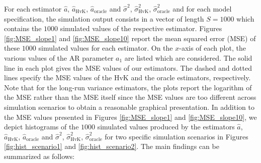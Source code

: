 For each estimator $\widehat{a}$, $\widehat{a}_{\text{HvK}}$, $\widehat{a}_{\text{oracle}}$ and $\widehat{\sigma}^2$, $\widehat{\sigma}^2_{\text{HvK}}$, $\widehat{\sigma}^2_{\text{oracle}}$ and for each model specification, the simulation output consists in a vector of length $S=1000$ which contains the $1000$ simulated values of the respective estimator. Figures \ref{fig:MSE_slope1} and \ref{fig:MSE_slope10} report the mean squared error (MSE) of these $1000$ simulated values for each estimator. On the $x$-axis of each plot, the various values of the AR parameter $a_1$ are listed which are considered. The solid line in each plot gives the MSE values of our estimators. The dashed and dotted lines specify the MSE values of the HvK and the oracle estimators, respectively. Note that for the long-run variance estimators, the plots report the logarithm of the MSE rather than the MSE itself since the MSE values are too different across simulation scenarios to obtain a reasonable graphical presentation. In addition to the MSE values presented in Figures \ref{fig:MSE_slope1} and \ref{fig:MSE_slope10}, we depict histograms of the $1000$ simulated values produced by the estimators $\widehat{a}$, $\widehat{a}_{\text{HvK}}$, $\widehat{a}_{\text{oracle}}$ and $\widehat{\sigma}^2$, $\widehat{\sigma}^2_{\text{HvK}}$, $\widehat{\sigma}^2_{\text{oracle}}$ for two specific simulation scenarios in Figures \ref{fig:hist_scenario1} and \ref{fig:hist_scenario2}. The main findings can be summarized as follows:  
